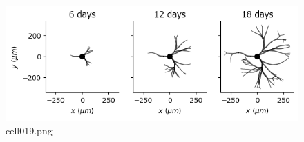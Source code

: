 \begin{figure}[ht]
	\centering
	\includegraphics[scale=0.8, max width=\linewidth]{./fig/neuron-model/neurite-growth-model/cell019.png}
	\caption{cell019.png}
	\label{cell019.png}
\end{figure}